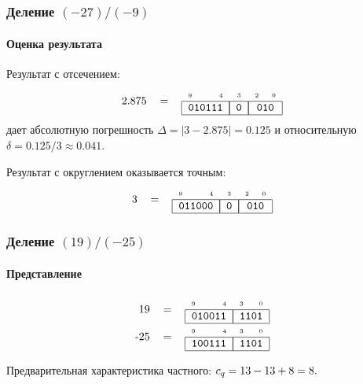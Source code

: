 \begin{frame}
    \frametitle{Деление $(-27)/(-9)$}
    \framesubtitle{Оценка результата}
        
    Результат с отсечением:
    \[
        \begin{tabular}{rcc}
           2.875 & = & \FloatMyDcOrderX{010111}{0}{010}
        \end{tabular}
    \]
    дает абсолютную погрешность $\Delta=|3-2.875|=0.125$ и относительную $\delta=0.125/3\approx 0.041$.
    
    Результат с округлением оказывается точным:
    \[
        \begin{tabular}{rcc}
           3 & = & \FloatMyDcOrderX{011000}{0}{010}
        \end{tabular}
    \]
\end{frame}

% 
\begin{frame}
    \frametitle{Деление $(19)/(-25)$}
    \framesubtitle{Представление}

    \[
        \begin{tabular}{rcc}
            19 & = & \FloatMyDcCharX{010011}{1101}\\
           -25 & = & \FloatMyDcCharX{100111}{1101}
        \end{tabular}
    \]
    
    Предварительная характеристика частного:
    \(c_{q}=13-13+8=8.\)
\end{frame}

